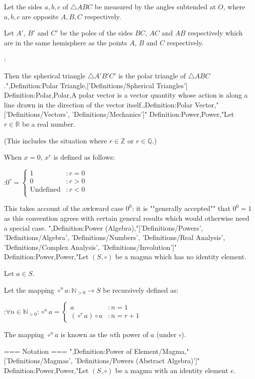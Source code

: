 Let the sides $a, b, c$ of $\triangle ABC$ be measured by the angles subtended at $O$, where $a, b, c$ are opposite $A, B, C$ respectively.


Let $A'$, $B'$ and $C'$ be the poles of the sides $BC$, $AC$ and $AB$ respectively which are in the same hemisphere as the points $A$, $B$ and $C$ respectively.

:

Then the spherical triangle $\triangle A'B'C'$ is the polar triangle of $\triangle ABC$.",Definition:Polar Triangle,['Definitions/Spherical Triangles']
Definition:Polar,Polar,A polar vector is a vector quantity whose action is along a line drawn in the direction of the vector itself.,Definition:Polar Vector,"['Definitions/Vectors', 'Definitions/Mechanics']"
Definition:Power,Power,"Let $r \in \mathbb R$ be a real number.

(This includes the situation where $r \in \mathbb Z$ or $r \in \mathbb Q$.)

When $x=0$, $x^r$ is defined as follows:

:$0^r = \begin{cases}
1 & : r = 0 \\
0 & : r > 0 \\
\text{Undefined} & : r < 0 \\
\end{cases}$

This takes account of the awkward case $0^0$: it is ""generally accepted"" that $0^0 = 1$ as this convention agrees with certain general results which would otherwise need a special case.
",Definition:Power (Algebra),"['Definitions/Powers', 'Definitions/Algebra', 'Definitions/Numbers', 'Definitions/Real Analysis', 'Definitions/Complex Analysis', 'Definitions/Involution']"
Definition:Power,Power,"Let $\left( S, \circ \right)$ be a magma which has no identity element.

Let $a \in S$.


Let the mapping $\circ^n a: \mathbb N_{>0} \to S$ be recursively defined as:

:$\forall n \in \mathbb N_{>0}: \circ^n a = \begin{cases}
a & : n = 1 \\
\left( \circ^r a \right) \circ a & : n = r + 1
\end{cases}$


The mapping $\circ^n a$ is known as the $n$th power of $a$ (under $\circ$).


=== Notation ===
",Definition:Power of Element/Magma,"['Definitions/Magmas', 'Definitions/Powers (Abstract Algebra)']"
Definition:Power,Power,"Let $\left( S, \circ \right)$ be a magma with an identity element $e$.

